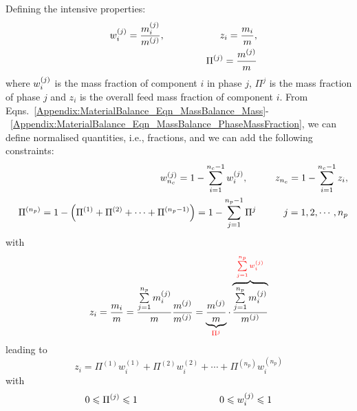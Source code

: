 Defining the intensive properties:
\begin{eqnarray}
&& \mfr[w]{i}{j} = \frc{\mfr[m]{i}{j}}{m^{(j)}}, \hspace{2cm} z_{i} = \frc{m_{i}}{m},\label{Appendix:MaterialBalance_Eqn_MassBalance_MassFraction} \\
&& \Pi^{(j)} = \frc{m^{(j)}}{m}\label{Appendix:MaterialBalance_Eqn_MassBalance_PhaseMassFraction} 
\end{eqnarray}
where $\mfr[w]{i}{j}$ is the mass fraction of component $i$ in phase $j$, $\Pi^{j}$ is the mass fraction of phase $j$ and $z_{i}$ is the overall feed mass fraction of component $i$. From Eqns.~\ref{Appendix:MaterialBalance_Eqn_MassBalance_Mass}-~\ref{Appendix:MaterialBalance_Eqn_MassBalance_PhaseMassFraction}, we can define normalised quantities, i.e., fractions, and we can add the following constraints:
\begin{eqnarray}
&&\mfr[w]{n_{c}}{j} = 1 - \summation_{i=1}^{n_{c}-1}\mfr[w]{i}{j},\hspace{1cm}  z_{n_{c}} = 1 - \summation_{i=1}^{n_{c}-1}z_{i},  \label{Appendix:MaterialBalance_Eqn_MassBalance_MassFraction2} \\
&&\Pi^{\left(n_{p}\right)} = 1 - \left(\Pi^{(1)} + \Pi^{(2)} + \cdots + \Pi^{\left(n_{p}-1\right)}\right) = 1 - \summation_{j=1}^{n_{p}-1} \Pi^{j}\hspace{1cm} j=1,2,\cdots,n_{p} \label{Appendix:MaterialBalance_Eqn_MassBalance_PhaseMassFraction2}
\end{eqnarray} 
with
\begin{displaymath}
  z_{i} = \frc{m_{i}}{m} = \frc{\summation_{j=1}^{n_{p}}\mfr[m]{i}{j}}{m} \frc{m^{(j)}}{m^{(j)}} = \underbrace{\frc{m^{(j)}}{m}}_{\red{\Pi^{j}}} \cdot \overbrace{\frc{\summation_{j=1}^{n_{p}}\mfr[m]{i}{j}}{m^{(j)}}}^{\red{\summation_{j=1}^{n_{p}}\mfr[w]{i}{j}}} 
\end{displaymath}
leading to
\begin{equation}
z_{i} = \Pi^{(1)}w_{i}^{(1)} + \Pi^{(2)}w_{i}^{(2)} + \cdots + \Pi^{\left(n_{p}\right)}w_{i}^{\left(n_{p}\right)}
\label{Appendix:MaterialBalance_Eqn_MassBalance_FeedMassFractionConstraint}
\end{equation}
with
\begin{equation}
0\leq\Pi^{(j)}\leq 1 \hspace{3cm} 0\leq \mfr[w]{i}{j}\leq 1
\end{equation}

